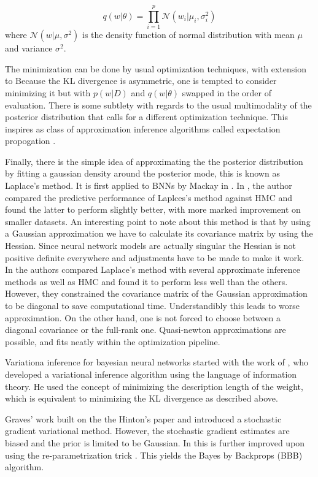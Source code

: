 \documentclass{book}
\begin{document}
\begin{enumerate}
\[ q(w|\theta) = \prod_{i=1}^p \mathcal{N}(w_i|\mu_i,\sigma^2_i) \]
where $\mathcal{N}(w|\mu,\sigma^2)$ is the density function of normal
distribution with mean $\mu$ and variance $\sigma^2$. 

The minimization can be done by usual optimization techniques, with extension to 
Because the KL divergence is asymmetric, one is tempted to consider
minimizing it but with $p(w|D)$ and $q(w|\theta)$ swapped in the order of
evaluation. There is some subtlety with regards to the usual multimodality of
the posterior distribution that calls for a different optimization technique.
This inspires as class of approximation inference algorithms called expectation
propogation \cite{minka2001expectation}. 

Finally, there is the simple idea of approximating the the posterior
distribution by fitting a gaussian density around the posterior mode, this is
known as Laplace's method. It is first applied to BNNs by Mackay in \cite{mackay1992evidence}. In \cite{vivarelli2001comparing}, the author compared the predictive performance of Laplces's method against HMC and found the latter to perform slightly better, with more marked improvement on smaller datasets. An interesting point to note about this method is that by using a Gaussian approximation we have to calculate its covariance matrix by using the Hessian. Since neural network models are actually singular the Hessian is not positive definite everywhere and adjustments have to be made to make it work. In \cite{hernandez2015probabilistic} the authors compared Laplace's method with several approximate inference methods as well as HMC and found it to perform less well than the others. However, they constrained the covariance matrix of the Gaussian approximation to be diagonal to save computational time. Understandibly this leads to worse approximation. On the other hand, one is not forced to choose between a diagonal covariance or the full-rank one. Quasi-newton approximations are possible, and fits neatly within the optimization pipeline.

Variationa inference for bayesian neural networks started with the work of \cite{hinton1993keeping}, who developed a variational inference algorithm using the language of information theory. He used the concept of minimizing the description length of the weight, which is equivalent to minimizing the KL divergence as described above. 

Graves' work \cite{graves2011practical} built on the the Hinton's paper and introduced a stochastic gradient variational method. However, the stochastic gradient estimates are biased and the prior is limited to be Gaussian. In \cite{blundell2015weight} this is further improved upon using the re-parametrization trick \cite{opper2009variational,kingma2013auto,rezende2014stochastic}. This yields the Bayes by Backprops (BBB) algorithm.


\end{enumerate}
\end{document}
